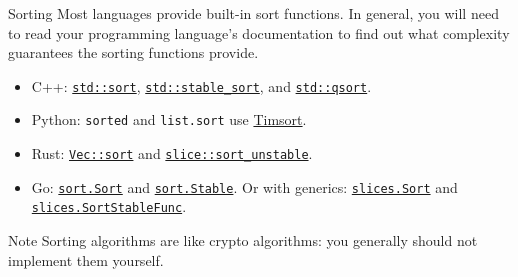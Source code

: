 \documentclass{algo}
\begin{document}
\begin{frame}{Sorting}
    Most languages provide built-in sort functions. In general, you will need to
    read your programming language's documentation to find out what complexity
    guarantees the sorting functions provide.

    \begin{itemize}
        \item C++:
            \href{https://en.cppreference.com/w/cpp/algorithm/sort}{\texttt{std::sort}},
            \href{https://en.cppreference.com/w/cpp/algorithm/stable_sort}{\texttt{std::stable\_sort}},
            and
            \href{https://en.cppreference.com/w/cpp/algorithm/qsort}{\texttt{std::qsort}}.

        \item Python: \texttt{sorted} and \texttt{list.sort} use
            \href{https://en.wikipedia.org/wiki/Timsort}{Timsort}.

        \item Rust:
            \href{https://doc.rust-lang.org/std/vec/struct.Vec.html\#method.sort}{\texttt{Vec::sort}}
            and
            \href{https://doc.rust-lang.org/std/primitive.slice.html\#method.sort_unstable}{\texttt{slice::sort\_unstable}}.

        \item Go:
            \href{https://pkg.go.dev/sort\#Sort}{\texttt{sort.Sort}} and
            \href{https://pkg.go.dev/sort\#Stable}{\texttt{sort.Stable}}. Or with
            generics:
            \href{https://pkg.go.dev/slices\#Sort}{\texttt{slices.Sort}} and
            \href{https://pkg.go.dev/slices\#SortStableFunc}{\texttt{slices.SortStableFunc}}.
    \end{itemize}

    \pause

    \begin{block}{Note}
        Sorting algorithms are like crypto algorithms: you generally should not
        implement them yourself.
    \end{block}
\end{frame}
\end{document}
